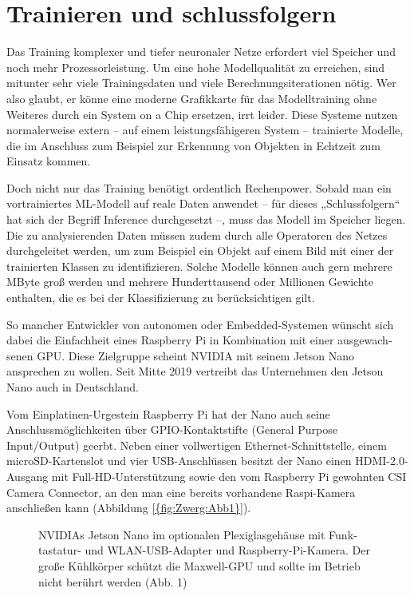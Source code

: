 \section{Trainieren und schlussfolgern}

Das Training komplexer und tiefer neuronaler Netze erfordert viel Speicher und noch mehr Prozessorleistung. Um eine hohe Modellqualität zu erreichen, sind mitunter sehr viele Trainingsdaten und viele Berechnungsiterationen nötig. Wer also glaubt, er könne eine moderne Grafikkarte für das Modelltraining ohne Weiteres durch ein System on a Chip ersetzen, irrt leider. Diese Systeme nutzen normalerweise extern – auf einem leistungsfähigeren System – trainierte Modelle, die im Anschluss zum Beispiel zur Erkennung von Objekten in Echtzeit zum Einsatz kommen. 

Doch nicht nur das Training benötigt ordentlich Rechenpower. Sobald man ein vortrainiertes ML-Modell auf reale Daten anwendet – für dieses „Schlussfolgern“ hat sich der Begriff Inference durch­gesetzt –, muss das Modell im Speicher liegen. Die zu analysierenden Daten müssen zudem durch alle Operatoren des Netzes durchgeleitet werden, um zum Beispiel ein Objekt auf einem Bild mit einer der trainierten Klassen zu identifizieren. Solche Modelle können auch gern mehrere MByte groß werden und mehrere Hunderttausend oder Millionen Gewichte enthalten, die es bei der Klassifizierung zu berücksichtigen gilt.  

So mancher Entwickler von autonomen oder Embedded-Systemen wünscht sich dabei die Einfachheit eines Raspberry Pi in Kombination mit einer ausgewach­senen GPU. Diese Zielgruppe scheint NVIDIA mit seinem Jetson Nano ansprechen zu wollen. Seit Mitte 2019 vertreibt das Unternehmen den Jetson Nano auch in Deutschland. 

Vom Einplatinen-Urgestein Raspberry Pi hat der Nano auch seine Anschlussmöglichkeiten über GPIO-Kontaktstifte (General Purpose Input/Output) geerbt. Neben einer vollwertigen Ethernet-Schnitt­stelle, einem microSD-Kartenslot und vier USB-Anschlüssen besitzt der Nano einen HDMI-2.0-Ausgang mit Full-HD-Unterstützung sowie den vom Raspberry Pi gewohnten CSI Camera Connector, an den man eine bereits vorhandene Raspi-­Kamera anschließen kann (Abbildung \ref{{fig:Zwerg:Abb1}}). 


\begin{figure}

  \caption[NVIDIAs Jetson Nano im optionalen Plexiglas­gehäuse]{NVIDIAs Jetson Nano im optionalen Plexiglas­gehäuse mit Funk­tastatur- und WLAN-USB-Adapter und Rasp­berry-Pi-Kamera. Der große Kühlkörper schützt die Maxwell-GPU und sollte im Betrieb nicht berührt werden (Abb. 1)}\label{fig:Zwerg:Abb1}
\end{figure}

